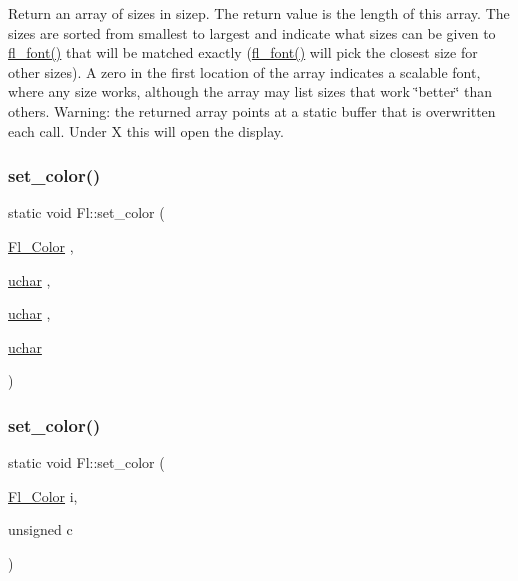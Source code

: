 Return an array of sizes in {\ttfamily sizep}. The return value is the length of this array. The sizes are sorted from smallest to largest and indicate what sizes can be given to \hyperlink{group__fl__attributes_ga80203d2dd1e06550e7a35d6bb72f9bd6}{fl\+\_\+font()} that will be matched exactly (\hyperlink{group__fl__attributes_ga80203d2dd1e06550e7a35d6bb72f9bd6}{fl\+\_\+font()} will pick the closest size for other sizes). A zero in the first location of the array indicates a scalable font, where any size works, although the array may list sizes that work \char`\"{}better\char`\"{} than others. Warning\+: the returned array points at a static buffer that is overwritten each call. Under X this will open the display. \mbox{\label{group__fl__attributes_gaed9b5e5a196cbbf3918cca83cb280d7a}} 
\subsubsection{\texorpdfstring{set\+\_\+color()}{set\_color()}\hspace{0.1cm}{\footnotesize\ttfamily [1/2]}}
{\footnotesize\ttfamily static void Fl\+::set\+\_\+color (\begin{DoxyParamCaption}\item[{\hyperlink{_enumerations_8_h_a8b762953646f8abee866061f1af78a6a}{Fl\+\_\+\+Color}}]{,  }\item[{\hyperlink{fl__types_8h_a65f85814a8290f9797005d3b28e7e5fc}{uchar}}]{,  }\item[{\hyperlink{fl__types_8h_a65f85814a8290f9797005d3b28e7e5fc}{uchar}}]{,  }\item[{\hyperlink{fl__types_8h_a65f85814a8290f9797005d3b28e7e5fc}{uchar}}]{ }\end{DoxyParamCaption})\hspace{0.3cm}{\ttfamily [static]}}

\mbox{\label{group__fl__attributes_ga6e7b4ee94a41e8f345f1d11fe20f8ff2}} 
\subsubsection{\texorpdfstring{set\+\_\+color()}{set\_color()}\hspace{0.1cm}{\footnotesize\ttfamily [2/2]}}
{\footnotesize\ttfamily static void Fl\+::set\+\_\+color (\begin{DoxyParamCaption}\item[{\hyperlink{_enumerations_8_h_a8b762953646f8abee866061f1af78a6a}{Fl\+\_\+\+Color}}]{i,  }\item[{unsigned}]{c }\end{DoxyParamCaption})\hspace{0.3cm}{\ttfamily [static]}}

